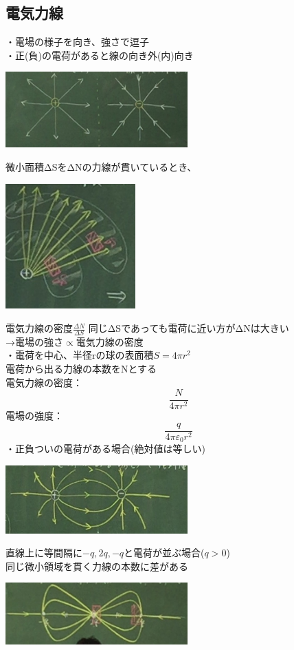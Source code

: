 \documentclass{jsarticle}
\begin{document}
	\subsection{電気力線}
		・電場の様子を向き、強さで逗子\\
		・正(負)の電荷があると線の向き外(内)向き\\
		\begin{center}
			\includegraphics[width=7cm]{5_10_3.JPG}
		\end{center}
		微小面積ΔSをΔNの力線が貫いているとき、\\
		\begin{center}
			\includegraphics[width=5cm]{5_10_4.JPG}
		\end{center}
		$電気力線の密度
			\frac{\Delta N}{\Delta S}$
		同じΔSであっても電荷に近い方がΔNは大きい\\
		→電場の強さ$\propto$電気力線の密度\\
		・電荷を中心、半径rの球の表面積$S=4\pi r^2$\\
		電荷から出る力線の本数をNとする\\
		電気力線の密度：
		\[\frac{N}{4\pi r^2}
		\]
		電場の強度：
		\[
			\frac{q}{4\pi \varepsilon_0 r^2}
		\]
		・正負ついの電荷がある場合(絶対値は等しい)
		\begin{center}
			\includegraphics[width=7cm]{5_10_5.JPG}
		\end{center}
		直線上に等間隔に$-q,2q,-q$と電荷が並ぶ場合($q>0$)\\
		同じ微小領域を貫く力線の本数に差がある\\
		\begin{center}
			\includegraphics[width=7cm]{5_10_6.JPG}
		\end{center}
\end{document}

